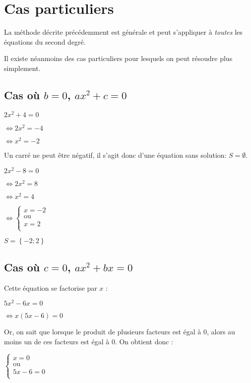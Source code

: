 \documentclass[a4paper,12pt]{scrartcl}
\begin{document}
\section{Cas particuliers}

La méthode décrite précédemment est générale et peut s'appliquer à \emph{toutes} les équations du second degré.

Il existe néanmoins des cas particuliers pour lesquels on peut résoudre plus simplement.

\subsection{Cas où $b = 0$, $ax^2 + c = 0$}

\exemple{}
$2x^2 + 4 = 0$

$\Leftrightarrow 2x^2 = -4$

$\Leftrightarrow x^2 = -2$

Un carré ne peut être négatif, il s'agit donc d'une équation sans solution: $S = \emptyset$.

\exemple{}
$2x^2 - 8 = 0$

$\Leftrightarrow 2x^2 = 8$

$\Leftrightarrow x^2 = 4$

$\Leftrightarrow 
\left\lbrace
\begin{array}{ll}
   x = -2 \\
   \mbox{ou} \\
   x = 2 \\
\end{array}
\right.
$ 

$S = \left\lbrace -2 ; 2 \right\rbrace$

\subsection{Cas où $c = 0$, $ax^2 + bx = 0$}

Cette équation se factorise par $x$ : 

\exemple{}
$5x^2 - 6x = 0$

$\Leftrightarrow x(5x-6) = 0$

Or, on sait que lorsque le produit de plusieurs facteurs est égal à $0$, alors au moins un de ces facteurs est égal à $0$. On obtient donc :

$\left\lbrace
\begin{array}{ll}
   x = 0 \\
   \mbox{ou} \\
   5x-6 = 0 \\
\end{array}
\right.
$ 
\end{document}
